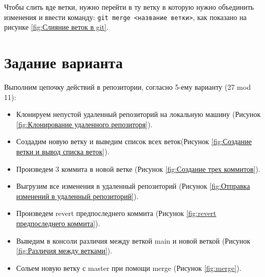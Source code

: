 Чтобы слить вде ветки, нужно перейти в ту ветку в которую нужно объединить изменения и ввести команду: \texttt{git~merge~<название~ветки>}, как показано
на рисунке \ref{fig:Слияние веток в git}.


\section{Задание варианта}
Выполним цепочку действий в репозитории, согласно 5-ему варианту (27 mod 11):
\begin{itemize}
    \item Клонируем непустой удаленный репозиторий на локальную
    машину (Рисунок \ref{fig:Клонирование удаленного репозиторя}).

    \item Создадим новую ветку и выведим список всех веток(Рисунок \ref{fig:Создание ветки и вывод списка веток}).
    
    \item Произведем 3 коммита в новой ветке (Рисунок \ref{fig:Создание трех коммитов}).

    \item Выгрузим все изменения в удаленный
    репозиторий (Рисунок \ref{fig:Отправка изменений в удаленный репозиторий}).

    \item Произведем revert предпоследнего коммита
    (Рисунок \ref{fig:revert предпоследнего коммита}).

    \item Выведим в консоли различия между веткой main
    и новой веткой (Рисунок \ref{fig:Различия между ветками}).

    \item Сольем новую ветку с master при помощи merge (Рисунок \ref{fig:merge}).
\end{itemize}